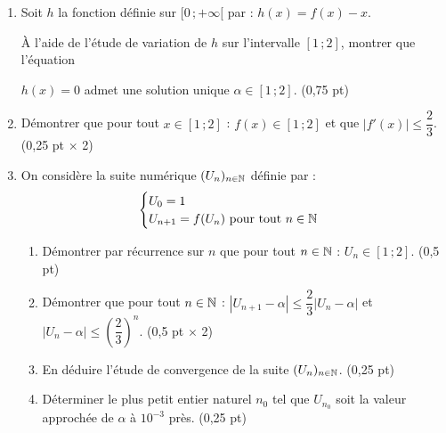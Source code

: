 \begin{enumerate}
	\item Soit $h$ la fonction définie sur $[0\,;+\infty[$ par : $h(x) = f(x) - x$.

	À l'aide de l'étude de variation de $h$ sur l'intervalle $[1\,;2]$, montrer que l'équation

	$h(x) = 0$ admet une solution unique $\alpha \in [1\,;2]$. \hfill (0,75 pt)
	\item Démontrer que pour tout $x \in [1\,;2]$ : $f(x) \in [1\,;2]$ et que $\left|f'(x)\right| \leqslant \dfrac{2}{3}$. \hfill (0,25 pt $\times$ 2)
	\item On considère la suite numérique $(U_n)_{n\in\mathbb{N}}$ définie par :
	$$
	\begin{cases}
		U_0 = 1 \\
		U_{n+1} = f(U_n) \text{ pour tout } n \in \mathbb{N}
	\end{cases}
	$$
	\begin{enumerate}
		\item Démontrer par récurrence sur $n$ que pour tout $n \in \mathbb{N}$ : $U_n \in [1\,;2]$. \hfill (0,5 pt)
		\item Démontrer que pour tout $n \in \mathbb{N}$ : $\left|U_{n+1}-\alpha\right| \leqslant \dfrac{2}{3}\left|U_n-\alpha\right|$ et $\left|U_n-\alpha\right| \leqslant \left(\dfrac{2}{3}\right)^n$. \hfill (0,5 pt $\times$ 2)
		\item En déduire l'étude de convergence de la suite $(U_n)_{n\in\mathbb{N}}$. \hfill (0,25 pt)
		\item Déterminer le plus petit entier naturel $n_0$ tel que $U_{n_0}$ soit la valeur approchée de $\alpha$ à $10^{-3}$ près. \hfill (0,25 pt)
	\end{enumerate}
\end{enumerate}
